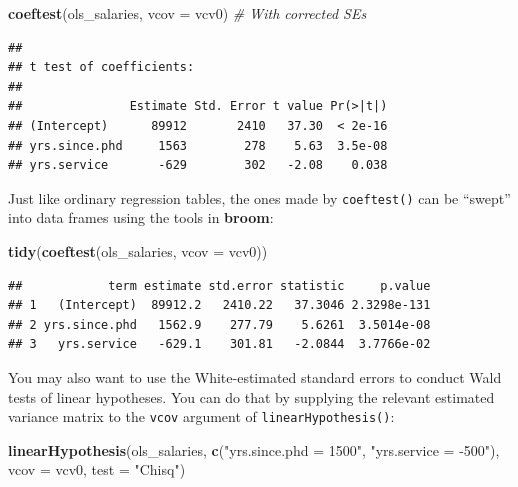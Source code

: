 \documentclass[12pt,oneside,openany]{book}
\newenvironment{Shaded}{\begin{snugshade}}{\end{snugshade}}
\newcommand{\KeywordTok}[1]{\textcolor[rgb]{0.13,0.29,0.53}{\textbf{#1}}}
\newcommand{\DataTypeTok}[1]{\textcolor[rgb]{0.13,0.29,0.53}{#1}}
\newcommand{\StringTok}[1]{\textcolor[rgb]{0.31,0.60,0.02}{#1}}
\newcommand{\CommentTok}[1]{\textcolor[rgb]{0.56,0.35,0.01}{\textit{#1}}}
\newcommand{\NormalTok}[1]{#1}
\begin{document}
\begin{Shaded}
\begin{Highlighting}[]
\KeywordTok{coeftest}\NormalTok{(ols_salaries, }\DataTypeTok{vcov =}\NormalTok{ vcv0)  }\CommentTok{# With corrected SEs}
\end{Highlighting}
\end{Shaded}

\begin{verbatim}
## 
## t test of coefficients:
## 
##               Estimate Std. Error t value Pr(>|t|)
## (Intercept)      89912       2410   37.30  < 2e-16
## yrs.since.phd     1563        278    5.63  3.5e-08
## yrs.service       -629        302   -2.08    0.038
\end{verbatim}

Just like ordinary regression tables, the ones made by
\texttt{coeftest()} can be ``swept'' into data frames using the tools in
\textbf{broom}:

\begin{Shaded}
\begin{Highlighting}[]
\KeywordTok{tidy}\NormalTok{(}\KeywordTok{coeftest}\NormalTok{(ols_salaries, }\DataTypeTok{vcov =}\NormalTok{ vcv0))}
\end{Highlighting}
\end{Shaded}

\begin{verbatim}
##            term estimate std.error statistic     p.value
## 1   (Intercept)  89912.2   2410.22   37.3046 2.3298e-131
## 2 yrs.since.phd   1562.9    277.79    5.6261  3.5014e-08
## 3   yrs.service   -629.1    301.81   -2.0844  3.7766e-02
\end{verbatim}

You may also want to use the White-estimated standard errors to conduct
Wald tests of linear hypotheses. You can do that by supplying the
relevant estimated variance matrix to the \texttt{vcov} argument of
\texttt{linearHypothesis()}:

\begin{Shaded}
\begin{Highlighting}[]
\KeywordTok{linearHypothesis}\NormalTok{(ols_salaries,}
                 \KeywordTok{c}\NormalTok{(}\StringTok{"yrs.since.phd = 1500"}\NormalTok{, }\StringTok{"yrs.service = -500"}\NormalTok{),}
                 \DataTypeTok{vcov =}\NormalTok{ vcv0,}
                 \DataTypeTok{test =} \StringTok{"Chisq"}\NormalTok{)}
\end{Highlighting}
\end{Shaded}
\end{document}
